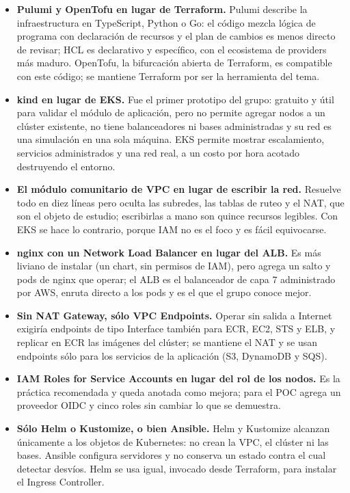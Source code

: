 \documentclass[11pt,a4paper]{article}
\begin{document}
\begin{itemize}
  \item \textbf{Pulumi y OpenTofu en lugar de Terraform.} Pulumi describe la infraestructura en
    TypeScript, Python o Go: el código mezcla lógica de programa con declaración de recursos y
    el plan de cambios es menos directo de revisar; HCL es declarativo y específico, con el
    ecosistema de providers más maduro. OpenTofu, la bifurcación abierta de Terraform, es
    compatible con este código; se mantiene Terraform por ser la herramienta del tema.
  \item \textbf{kind en lugar de EKS.} Fue el primer prototipo del grupo: gratuito y útil para
    validar el módulo de aplicación, pero no permite agregar nodos a un clúster existente, no
    tiene balanceadores ni bases administradas y su red es una simulación en una sola máquina.
    EKS permite mostrar escalamiento, servicios administrados y una red real, a un costo por
    hora acotado destruyendo el entorno.
  \item \textbf{El módulo comunitario de VPC en lugar de escribir la red.} Resuelve todo en diez
    líneas pero oculta las subredes, las tablas de ruteo y el NAT, que son el objeto de estudio;
    escribirlas a mano son quince recursos legibles. Con EKS se hace lo contrario, porque IAM
    no es el foco y es fácil equivocarse.
  \item \textbf{nginx con un Network Load Balancer en lugar del ALB.} Es más liviano de
    instalar (un chart, sin permisos de IAM), pero agrega un salto y pods de nginx que operar;
    el ALB es el balanceador de capa 7 administrado por AWS, enruta directo a los pods y es el
    que el grupo conoce mejor.
  \item \textbf{Sin NAT Gateway, sólo VPC Endpoints.} Operar sin salida a Internet exigiría
    endpoints de tipo Interface también para ECR, EC2, STS y ELB, y replicar en ECR las
    imágenes del clúster; se mantiene el NAT y se usan endpoints sólo para los servicios de la
    aplicación (S3, DynamoDB y SQS).
  \item \textbf{IAM Roles for Service Accounts en lugar del rol de los nodos.} Es la práctica
    recomendada y queda anotada como mejora; para el POC agrega un proveedor OIDC y cinco roles
    sin cambiar lo que se demuestra.
  \item \textbf{Sólo Helm o Kustomize, o bien Ansible.} Helm y Kustomize alcanzan únicamente a
    los objetos de Kubernetes: no crean la VPC, el clúster ni las bases. Ansible configura
    servidores y no conserva un estado contra el cual detectar desvíos. Helm se usa igual,
    invocado desde Terraform, para instalar el Ingress Controller.
\end{itemize}
\end{document}

